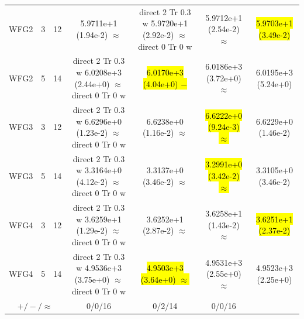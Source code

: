 \documentclass[conference]{IEEEtran}
\newcommand{\semitextbf}[1]{%
	\pdfliteral direct {2 Tr 0.3 w} %
	#1%
	\pdfliteral direct {0 Tr 0 w}%
}
\begin{document}
\begin{table}[!t]
\begin{tabular}{ccccccc}
    \multirow{1}{*}{WFG2}&3&12&5.9711e+1 (1.94e-2) $\approx$&\semitextbf{5.9720e+1 (2.92e-2) $\approx$}&5.9712e+1 (2.54e-2) $\approx$&\hl{5.9703e+1 (3.49e-2)}\\
    \multirow{1}{*}{WFG2}&5&14&\semitextbf{6.0208e+3 (2.44e+0) $\approx$}&\hl{6.0170e+3 (4.04e+0) $-$}&6.0186e+3 (3.72e+0) $\approx$&6.0195e+3 (5.24e+0)\\
    \multirow{1}{*}{WFG3}&3&12&\semitextbf{6.6296e+0 (1.23e-2) $\approx$}&6.6238e+0 (1.16e-2) $\approx$&\hl{6.6222e+0 (9.24e-3) $\approx$}&6.6229e+0 (1.46e-2)\\
    \multirow{1}{*}{WFG3}&5&14&\semitextbf{3.3164e+0 (4.12e-2) $\approx$}&3.3137e+0 (3.46e-2) $\approx$&\hl{3.2991e+0 (3.42e-2) $\approx$}&3.3105e+0 (3.46e-2)\\
    \multirow{1}{*}{WFG4}&3&12&\semitextbf{3.6259e+1 (1.29e-2) $\approx$}&3.6252e+1 (2.87e-2) $\approx$&3.6258e+1 (1.43e-2) $\approx$&\hl{3.6251e+1 (2.37e-2)}\\
    \multirow{1}{*}{WFG4}&5&14&\semitextbf{4.9536e+3 (3.75e+0) $\approx$}&\hl{4.9503e+3 (3.64e+0) $\approx$}&4.9531e+3 (2.55e+0) $\approx$&4.9523e+3 (2.25e+0)\\
    \hline
    \multicolumn{3}{c}{$+/-/\approx$}&0/0/16&0/2/14&0/0/16&\\
    \bottomrule
    \end{tabular}
\end{table}
\end{document}
